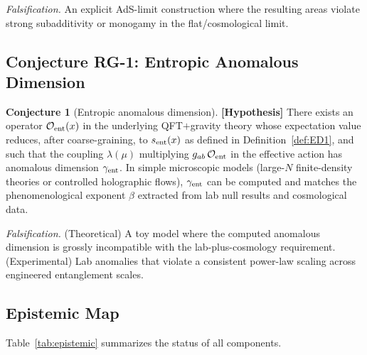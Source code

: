\documentclass[12pt,letterpaper]{article}
\theoremstyle{definition}
\newtheorem{conjecture}[theorem]{Conjecture}
\theoremstyle{remark}
\newcommand{\hypothesis}{\textbf{[Hypothesis]}}
\newcommand{\sent}{s_{\rm ent}}
\begin{document}
\textit{Falsification.} An explicit AdS-limit construction where the resulting areas
violate strong subadditivity or monogamy in the flat/cosmological limit.

\subsection{Conjecture RG-1: Entropic Anomalous Dimension}

\begin{conjecture}[Entropic anomalous dimension] \label{conj:RG1}
\hypothesis{}
There exists an operator $\mathcal{O}_{\rm ent}(x)$ in the underlying QFT$+$gravity
theory whose expectation value reduces, after coarse-graining, to $\sent(x)$ as
defined in Definition~\ref{def:ED1}, and such that the coupling $\lambda(\mu)$ multiplying
$g_{ab}\,\mathcal{O}_{\rm ent}$ in the effective action has anomalous dimension
$\gamma_{\rm ent}$.
In simple microscopic models (large-$N$ finite-density theories or controlled holographic
flows), $\gamma_{\rm ent}$ can be computed and matches the phenomenological exponent
$\beta$ extracted from lab null results and cosmological data.
\end{conjecture}

\textit{Falsification.}
(Theoretical) A toy model where the computed anomalous dimension is grossly incompatible
with the lab-plus-cosmology requirement.
(Experimental) Lab anomalies that violate a consistent power-law scaling across
engineered entanglement scales.

\subsection{Epistemic Map}
\label{sec:epistemicmap}

Table~\ref{tab:epistemic} summarizes the status of all components.
\end{document}
